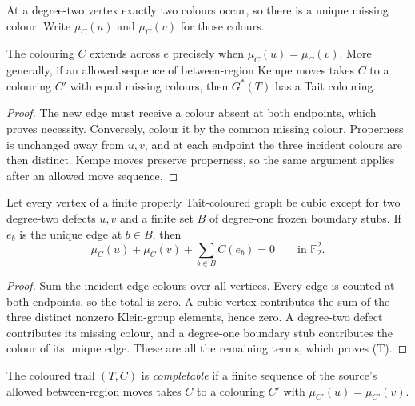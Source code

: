 At a degree-two vertex exactly two colours occur, so there is a unique
missing colour.  Write $\mu_C(u)$ and $\mu_C(v)$ for those colours.

\begin{lemma}
\label{lem:trail-one-edge-completion}
The colouring $C$ extends across $e$ precisely when
$\mu_C(u)=\mu_C(v)$.  More generally, if an allowed sequence of
between-region Kempe moves takes $C$ to a colouring $C'$ with equal
missing colours, then $G^{*}(T)$ has a Tait colouring.
\end{lemma}

\begin{proof}
The new edge must receive a colour absent at both endpoints, which proves
necessity.  Conversely, colour it by the common missing colour.  Properness
is unchanged away from $u,v$, and at each endpoint the three incident
colours are then distinct.  Kempe moves preserve properness, so the same
argument applies after an allowed move sequence.
\end{proof}

\begin{theorem}
\label{thm:two-defect-boundary-flux}
Let every vertex of a finite properly Tait-coloured graph be cubic except for
two degree-two defects \(u,v\) and a finite set \(B\) of degree-one frozen
boundary stubs.  If \(e_b\) is the unique edge at \(b\in B\), then
\[
       \mu_C(u)+\mu_C(v)+\sum_{b\in B} C(e_b)=0
       \qquad\text{in }\mathbb F_2^2.                 \tag{T}
\]
\end{theorem}

\begin{proof}
Sum the incident edge colours over all vertices.  Every edge is counted at
both endpoints, so the total is zero.  A cubic vertex contributes the sum of
the three distinct nonzero Klein-group elements, hence zero.  A degree-two
defect contributes its missing colour, and a degree-one boundary stub
contributes the colour of its unique edge.  These are all the remaining
terms, which proves (T).
\end{proof}

\begin{definition}
\label{def:source-trail-completability}
The coloured trail $(T,C)$ is \emph{completable} if a finite sequence of
the source's allowed between-region moves takes $C$ to a colouring $C'$
with $\mu_{C'}(u)=\mu_{C'}(v)$.
\end{definition}

